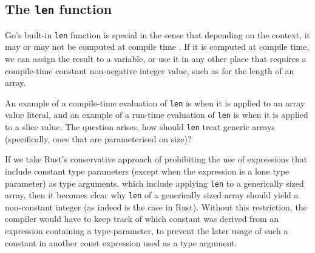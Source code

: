 








\subsection{The \texttt{len} function}

Go's built-in \texttt{len} function is special in the sense that depending on
the context, it may or may not be computed at compile time \autocite{spec}. If
it is computed at compile time, we can assign the result to a 
variable, or use it in any other place that requires a compile-time constant
non-negative integer value, such as for the length of an array.

An example of a compile-time evaluation of \texttt{len} is when it is applied to
an array value literal, and an example of a run-time evaluation of \texttt{len}
is when it is applied to a slice value. The question arises, how should
\texttt{len} treat generic arrays (specifically, ones that are parameterised on
size)?

If we take Rust's conservative approach of prohibiting the use of expressions
that include constant type parameters (except when the expression is a lone type
parameter) as type arguments, which include applying \texttt{len} to a
generically sized array, then it becomes clear why \texttt{len} of a generically
sized array should yield a non-constant integer (as indeed is the case in Rust).
Without this restriction, the compiler would have to keep track of which
constant was derived from an expression containing a type-parameter, to prevent
the later usage of such a constant in another const expression used as a type
argument.

